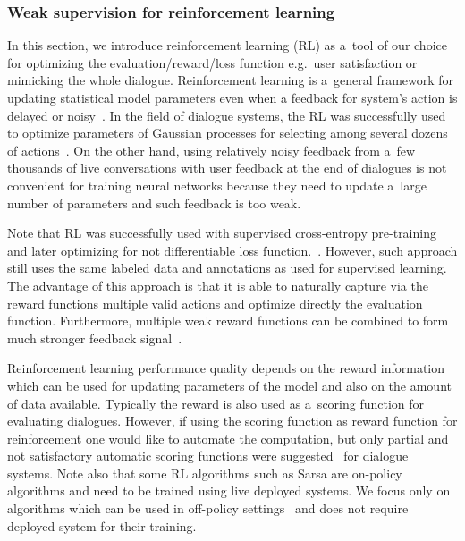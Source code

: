 \documentclass[11pt]{article}
\begin{document}
\subsubsection*{Weak supervision for reinforcement learning}\label{sub:batch_rl}

In this section, we introduce reinforcement learning (RL) as a~tool of our choice for optimizing the evaluation/reward/loss function e.g.\ user satisfaction or mimicking the whole dialogue.
Reinforcement learning is a~general framework for updating statistical model parameters even when a feedback for system's action is delayed or noisy~\cite{williams2016end,bahdanau_actor-critic_2016,wierstra_recurrent_2010}.
In the field of dialogue systems, the RL was successfully used to optimize parameters of Gaussian processes for selecting among several dozens of actions~\cite{gasic2011line}.
On the other hand, using relatively noisy feedback from a~few thousands of live conversations with user feedback at the end of dialogues is not convenient for training neural networks because they need to update a~large number of parameters and such feedback is too weak.

Note that RL was successfully used with supervised cross-entropy pre-training and later optimizing for not differentiable loss function.~\cite{williams2016end}.
However, such approach still uses the same labeled data and annotations as used for supervised learning.
The advantage of this approach is that it is able to naturally capture via the reward functions multiple valid actions and optimize directly the evaluation function.
Furthermore, multiple weak reward functions can be combined to form much stronger feedback signal~\cite{abbeel_apprenticeship_2004}.

Reinforcement learning performance quality depends on the reward information which can be used for updating parameters of the model and also on the amount of data available.
Typically the reward is also used as a~scoring function for evaluating dialogues.
However, if using the scoring function as reward function for reinforcement one would like to automate the computation, but only partial and not satisfactory automatic scoring functions were suggested~\cite{liu_how_2016,lowe_evaluation_2016} for dialogue systems. 
Note also that some RL algorithms such as Sarsa are on-policy algorithms and need to be trained using live deployed systems.
We focus only on algorithms which can be used in off-policy settings~\cite{sutton_reinforcement_1998} and does not require deployed system for their training.
\end{document}
